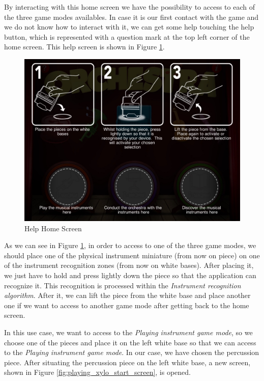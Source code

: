 \newpage

By interacting with this home screen we have the possibility to access to each of the three game modes availables. In case it is our first contact with the game and we do not know how to interact with it, we can get some help touching the help button, which is represented with a question mark at the top left corner of the home screen. This help screen is shown in Figure \ref{fig:help_home_screen}.

\begin{figure}[ht!]
	\centering
	\includegraphics[width=400pt]{graphics/use-case/help_home_screen.jpg}
	\caption{Help Home Screen}
	\label{fig:help_home_screen}
\end{figure}

As we can see in Figure \ref{fig:help_home_screen}, in order to access to one of the three game modes, we should place one of the physical instrument miniature (from now on piece) on one of the instrument recognition zones (from now on white bases). After placing it, we just have to hold and press lightly down the piece so that the application can recognize it. This recognition is processed within the \textit{Instrument recognition algorithm}. After it, we can lift the piece from the white base and place another one if we want to access to another game mode after getting back to the home screen.

In this use case, we want to access to the \textit{Playing instrument game mode}, so we choose one of the pieces and place it on the left white base so that we can access to the \textit{Playing instrument game mode}. In our case, we have chosen the percussion piece. After situating the percussion piece on the left white base, a new screen, shown in Figure \ref{fig:playing_xylo_start_screen}, is opened.

